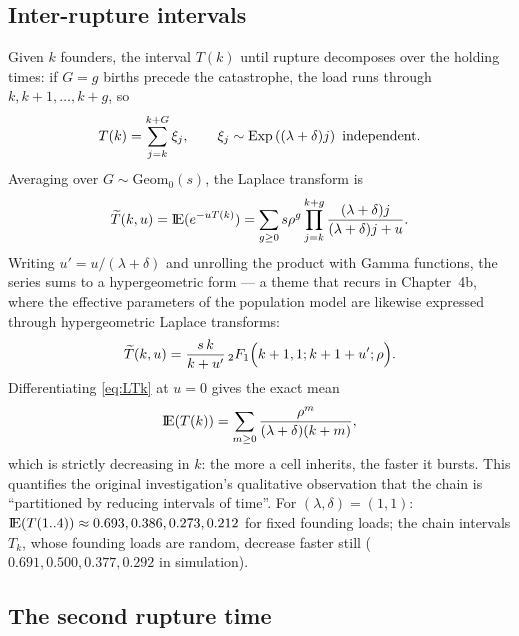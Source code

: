 \subsection{Inter-rupture intervals}

Given $k$ founders, the interval $T(k)$ until rupture decomposes over the
holding times: if $G=g$ births precede the catastrophe, the load runs
through $k,k+1,\ldots,k+g$, so
\begin{equation}
T(k)=\sum_{j=k}^{k+G}\xi_j,
\qquad
\xi_j\sim\mathrm{Exp}\lrb{(\lambda+\delta)j}\ \text{independent}.
\end{equation}
Averaging over $G\sim\mathrm{Geom}_0(s)$, the Laplace transform is
\begin{equation}
\widetilde{T}(k,u)={\rm I}\!{\rm E}(e^{-uT(k)})
=\sum_{g\ge0}s\rho^g\prod_{j=k}^{k+g}\frac{(\lambda+\delta)j}{(\lambda+\delta)j+u}.
\label{eq:LTk}
\end{equation}
Writing $u'=u/(\lambda+\delta)$ and unrolling the product with Gamma
functions, the series sums to a hypergeometric form --- a theme that recurs
in Chapter~4b, where the effective parameters of the population model are
likewise expressed through hypergeometric Laplace transforms:
\begin{equation}
\widetilde{T}(k,u)=\frac{s\,k}{k+u'}\,{}_2F_1\Bigl(k+1,1;k+1+u';\rho\Bigr).
\label{eq:LTk-hyp}
\end{equation}
Differentiating \eqref{eq:LTk} at $u=0$ gives the exact mean
\begin{equation}
{\rm I}\!{\rm E}(T(k))=\sum_{m\ge0}\frac{\rho^m}{(\lambda+\delta)(k+m)},
\label{eq:meanT}
\end{equation}
which is strictly decreasing in $k$: the more a cell inherits, the faster it
bursts. This quantifies the original investigation's qualitative
observation that the chain is ``partitioned by reducing intervals of time''.
For $(\lambda,\delta)=(1,1)$: ${\rm I}\!{\rm E}(T(1..4))\approx0.693,0.386,0.273,0.212$
for fixed founding loads; the chain intervals $T_k$, whose founding loads
are random, decrease faster still
($0.691,0.500,0.377,0.292$ in simulation).

\subsection{The second rupture time}

